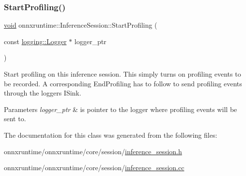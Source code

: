\subsubsection{\texorpdfstring{Start\+Profiling()}{StartProfiling()}\hspace{0.1cm}{\footnotesize\ttfamily [2/2]}}
{\footnotesize\ttfamily \mbox{\hyperlink{mlasi_8h_a88f941d423cb2a819b70a1358982b1a6}{void}} onnxruntime\+::\+Inference\+Session\+::\+Start\+Profiling (\begin{DoxyParamCaption}\item[{const \mbox{\hyperlink{classonnxruntime_1_1logging_1_1Logger}{logging\+::\+Logger}} $\ast$}]{logger\+\_\+ptr }\end{DoxyParamCaption})}

Start profiling on this inference session. This simply turns on profiling events to be recorded. A corresponding End\+Profiling has to follow to send profiling events through the logger\textquotesingle{}s I\+Sink. 
\begin{DoxyParams}{Parameters}
{\em logger\+\_\+ptr} & is pointer to the logger where profiling events will be sent to. \\
\hline
\end{DoxyParams}


The documentation for this class was generated from the following files\+:\begin{DoxyCompactItemize}
\item 
onnxruntime/onnxruntime/core/session/\mbox{\hyperlink{inference__session_8h}{inference\+\_\+session.\+h}}\item 
onnxruntime/onnxruntime/core/session/\mbox{\hyperlink{inference__session_8cc}{inference\+\_\+session.\+cc}}\end{DoxyCompactItemize}
